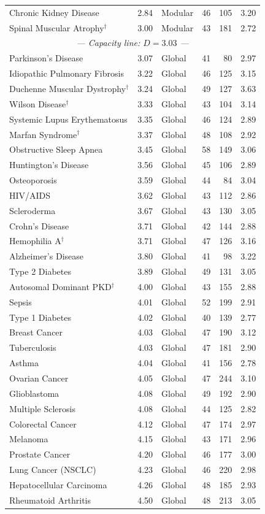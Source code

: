 \documentclass[11pt,a4paper]{article}
\begin{document}
\begin{longtable}{l r l r r r}
Chronic Kidney Disease & 2.84 & Modular & 46 & 105 & 3.20 \\
Spinal Muscular Atrophy$^\dagger$ & 3.00 & Modular & 43 & 181 & 2.72 \\
\midrule
\multicolumn{6}{c}{\textit{--- Capacity line: $D = 3.03$ ---}} \\
\midrule
Parkinson's Disease & 3.07 & Global & 41 & 80 & 2.97 \\
Idiopathic Pulmonary Fibrosis & 3.22 & Global & 46 & 125 & 3.15 \\
Duchenne Muscular Dystrophy$^\dagger$ & 3.24 & Global & 49 & 127 & 3.63 \\
Wilson Disease$^\dagger$ & 3.33 & Global & 43 & 104 & 3.14 \\
Systemic Lupus Erythematosus & 3.35 & Global & 46 & 124 & 2.89 \\
Marfan Syndrome$^\dagger$ & 3.37 & Global & 48 & 108 & 2.92 \\
Obstructive Sleep Apnea & 3.45 & Global & 58 & 149 & 3.06 \\
Huntington's Disease & 3.56 & Global & 45 & 106 & 2.89 \\
Osteoporosis & 3.59 & Global & 44 & 84 & 3.04 \\
HIV/AIDS & 3.62 & Global & 43 & 112 & 2.86 \\
Scleroderma & 3.67 & Global & 43 & 130 & 3.05 \\
Crohn's Disease & 3.71 & Global & 42 & 144 & 2.88 \\
Hemophilia A$^\dagger$ & 3.71 & Global & 47 & 126 & 3.16 \\
Alzheimer's Disease & 3.80 & Global & 41 & 98 & 3.22 \\
Type 2 Diabetes & 3.89 & Global & 49 & 131 & 3.05 \\
Autosomal Dominant PKD$^\dagger$ & 4.00 & Global & 43 & 155 & 2.88 \\
Sepsis & 4.01 & Global & 52 & 199 & 2.91 \\
Type 1 Diabetes & 4.02 & Global & 40 & 139 & 2.77 \\
Breast Cancer & 4.03 & Global & 47 & 190 & 3.12 \\
Tuberculosis & 4.03 & Global & 47 & 181 & 2.90 \\
Asthma & 4.04 & Global & 41 & 156 & 2.78 \\
Ovarian Cancer & 4.05 & Global & 47 & 244 & 3.10 \\
Glioblastoma & 4.08 & Global & 49 & 192 & 2.90 \\
Multiple Sclerosis & 4.08 & Global & 44 & 125 & 2.82 \\
Colorectal Cancer & 4.12 & Global & 47 & 174 & 2.97 \\
Melanoma & 4.15 & Global & 43 & 171 & 2.96 \\
Prostate Cancer & 4.20 & Global & 46 & 177 & 3.00 \\
Lung Cancer (NSCLC) & 4.23 & Global & 46 & 220 & 2.98 \\
Hepatocellular Carcinoma & 4.26 & Global & 48 & 185 & 2.93 \\
Rheumatoid Arthritis & 4.50 & Global & 48 & 213 & 3.05 \\
\bottomrule
\end{longtable}
\end{document}
